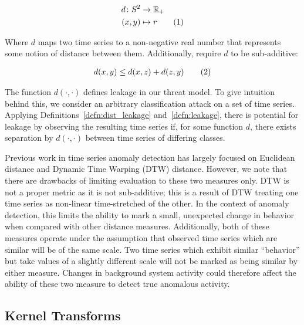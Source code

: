 \documentclass[a4paper]{article}
\newcommand\numberthis{\addtocounter{equation}{1}\tag{\theequation}}
\begin{document}
\begin{align*}
    d \colon S^2 &\to \mathbb{R}_{+}\\
    (x,y) &\mapsto r \numberthis
\end{align*}

Where $d$ maps two time series to a non-negative real number that represents some notion of distance between them.
Additionally, require $d$ to be sub-additive:

\begin{align*}
    d(x,y) \le d(x,z) + d(z,y) \numberthis
\end{align*}


The function $d(\cdot,\cdot)$ defines leakage in our threat model.
To give intuition behind this, we consider an arbitrary classification attack on a set of time series.
Applying Definitions~\ref{defn:dist_leakage} and~\ref{defn:leakage}, there is potential for leakage by observing the resulting time series if, for some function $d$, there exists separation by $d(\cdot, \cdot)$ between time series of differing classes.




Previous work in time series anomaly detection has largely focused on Euclidean distance and Dynamic Time Warping (DTW) distance.
However, we note that there are drawbacks of limiting evaluation to these two measures only.
DTW is not a proper metric as it is not sub-additive; this is a result of DTW treating one time series as non-linear time-stretched of the other.
In the context of anomaly detection, this limits the ability to mark a small, unexpected change in behavior when compared with other distance measures.
Additionally, both of these measures operate under the assumption that observed time series which are similar will be of the same scale.
Two time series which exhibit similar ``behavior'' but take values of a slightly different scale will not be marked as being similar by either measure.
Changes in background system activity could therefore affect the ability of these two measure to detect true anomalous activity.

\subsection{Kernel Transforms}
\label{subsec:kernel_transforms}
\end{document}
